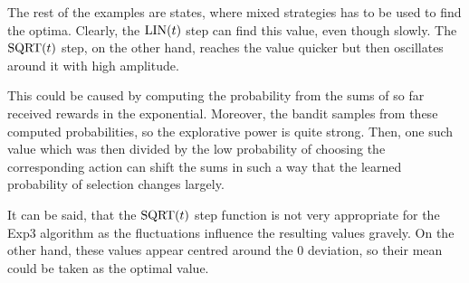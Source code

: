\documentclass[../main.tex]{subfiles}
\begin{document}
The rest of the examples are states, where mixed strategies has to be used to find the optima.
Clearly, the $\text{LIN}(t)$ step can find this value, even though slowly.
The $\text{SQRT}(t)$ step, on the other hand, reaches the value quicker but then oscillates around it with high amplitude.

This could be caused by computing the probability from the sums of so far received rewards in the exponential.
Moreover, the bandit samples from these computed probabilities, so the explorative power is quite strong.
Then, one such value which was then divided by the low probability of choosing the corresponding action can shift the sums in such a way that the learned probability of selection changes largely.

It can be said, that the $\text{SQRT}(t)$ step function is not very appropriate for the Exp3 algorithm as the fluctuations influence the resulting values gravely.
On the other hand, these values appear centred around the 0 deviation, so their mean could be taken as the optimal value.
\end{document}
